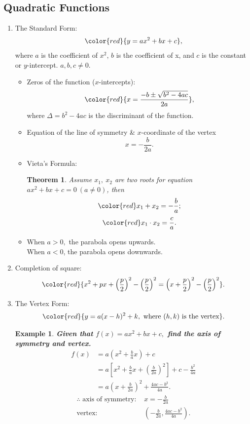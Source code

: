 \documentclass[12pt, a4paper]{article}
\newtheorem{theorem}{Theorem}[subsection]
\newtheorem{example}{Example}[subsection]
\begin{document}
\subsection{Quadratic Functions}
\begin{enumerate}
    \item The Standard Form: 
    $$\color{red}{y=ax^2+bx+c},$$
    where $a$ is the coefficient of $x^2$, $b$ is the coefficient of x, and $c$ is the constant or $y$-intercept. $a,b,c\neq 0$. 
    \begin{itemize}
        \item Zeros of the function ($x$-intercepts): 
        $$\color{red}{x=\frac{-b\pm\sqrt{b^2-4ac}}{2a}},$$
        where $\Delta=b^2-4ac$ is the discriminant of the function. 
        \item Equation of the line of symmetry \& $x$-coordinate of the vertex
        $$x=-\frac{b}{2a}.$$
        \item Vieta's Formula: 
        \begin{theorem}
            Assume $x_1,\ x_2$ are two roots for equation $ax^2+bx+c=0\ (a\neq 0)$, then
            $$\color{red}x_1+x_2=-\frac{b}{a};$$
            $$\color{red}x_1\cdot x_2=\frac{c}{a}.$$
        \end{theorem}
        \item When $a>0,$ the parabola opens upwards. \\
        When $a<0$, the parabola opens downwards.
    \end{itemize}
    \item Completion of square: 
    $${\color{red}{x^2+px+\left(\frac{p}{2}\right)^2-\left(\frac{p}{2}\right)^2=\left(x+\frac{p}{2}\right)^2-\left(\frac{p}{2}\right)^2}}.$$
    \item The Vertex Form: 
    $${\color{red}{y=a(x-h)^2+k,\text{ where }(h,k)\text{ is the vertex}}}.$$
    \begin{example}
        \textbf{Given that $f(x)=ax^2+bx+c,$ find the axis of symmetry and vertex.}
        $$\begin{aligned}
            f(x)&=a\left(x^2+\frac{b}{a}x\right)+c\\
            &=a\left[x^2+\frac{b}{a}x+\left(\frac{b}{2a}\right)^2\right]+c-\frac{b^2}{4a}\\
            &=a\left(x+\frac{b}{2a}\right)^2+\frac{4ac-b^2}{4a}.
        \end{aligned}$$
        $$\begin{aligned}
            \therefore \text{ axis of symmetry: }&x=-\frac{b}{2a}\\
            \text{vertex: }&\left(-\frac{b}{2a},\frac{4ac-b^2}{4a}\right).
        \end{aligned}$$
    \end{example}
\end{enumerate}
\end{document}

